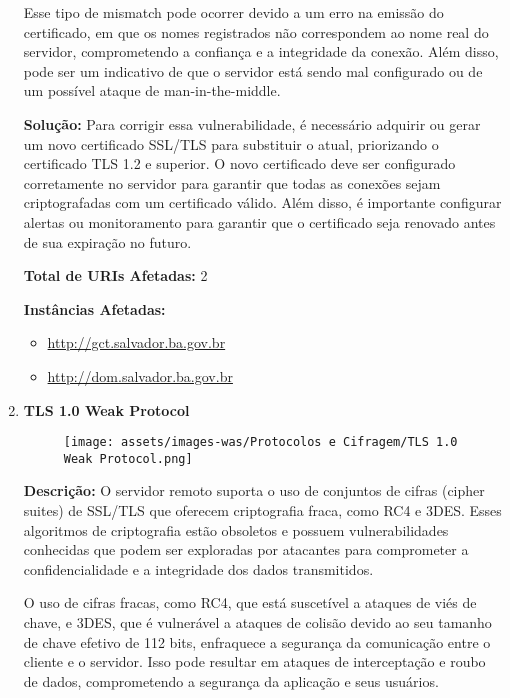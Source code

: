 \documentclass[a4paper,12pt]{article}
\begin{document}
\begin{enumerate}
    Esse tipo de mismatch pode ocorrer devido a um erro na emissão do certificado, em que os nomes registrados não correspondem ao nome real do servidor, comprometendo a confiança e a integridade da conexão. Além disso, pode ser um indicativo de que o servidor está sendo mal configurado ou de um possível ataque de man-in-the-middle.

\textbf{Solução:} Para corrigir essa vulnerabilidade, é necessário adquirir ou gerar um novo certificado SSL/TLS para substituir o atual, priorizando o certificado TLS 1.2 e superior. O novo certificado deve ser configurado corretamente no servidor para garantir que todas as conexões sejam criptografadas com um certificado válido. Além disso, é importante configurar alertas ou monitoramento para garantir que o certificado seja renovado antes de sua expiração no futuro.

\textbf{Total de URIs Afetadas:} 2

\textbf{Instâncias Afetadas:}
\begin{itemize}
    \item \url{http://gct.salvador.ba.gov.br}
    \item \url{http://dom.salvador.ba.gov.br}
\end{itemize}

\item \textbf{TLS 1.0 Weak Protocol}

                        \begin{figure}[h!]
                        \centering
                        \texttt{[image: assets/images-was/Protocolos e Cifragem/TLS 1.0 Weak Protocol.png]}
                        \end{figure}
                        \FloatBarrier
                        \textbf{Descrição:} O servidor remoto suporta o uso de conjuntos de cifras (cipher suites) de SSL/TLS que oferecem criptografia fraca, como RC4 e 3DES. Esses algoritmos de criptografia estão obsoletos e possuem vulnerabilidades conhecidas que podem ser exploradas por atacantes para comprometer a confidencialidade e a integridade dos dados transmitidos.

    O uso de cifras fracas, como RC4, que está suscetível a ataques de viés de chave, e 3DES, que é vulnerável a ataques de colisão devido ao seu tamanho de chave efetivo de 112 bits, enfraquece a segurança da comunicação entre o cliente e o servidor. Isso pode resultar em ataques de interceptação e roubo de dados, comprometendo a segurança da aplicação e seus usuários.


\end{enumerate}
\end{document}
